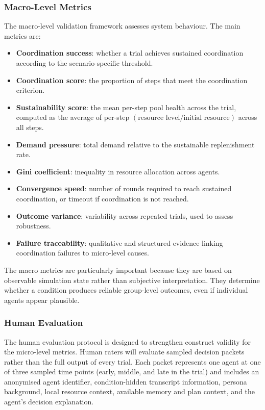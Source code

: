\documentclass[11pt]{article}
\begin{document}
\subsubsection{Macro-Level Metrics}
The macro-level validation framework assesses system behaviour. The main metrics are:

\begin{itemize}
    \item \textbf{Coordination success}: whether a trial achieves sustained coordination according to the scenario-specific threshold.
    \item \textbf{Coordination score}: the proportion of steps that meet the coordination criterion.
    \item \textbf{Sustainability score}: the mean per-step pool health across the trial, computed as the average of per-step $(\text{resource level} / \text{initial resource})$ across all steps.
    \item \textbf{Demand pressure}: total demand relative to the sustainable replenishment rate.
    \item \textbf{Gini coefficient}: inequality in resource allocation across agents.
    \item \textbf{Convergence speed}: number of rounds required to reach sustained coordination, or timeout if coordination is not reached.
    \item \textbf{Outcome variance}: variability across repeated trials, used to assess robustness.
    \item \textbf{Failure traceability}: qualitative and structured evidence linking coordination failures to micro-level causes.
\end{itemize}

The macro metrics are particularly important because they are based on observable simulation state rather than subjective interpretation. They determine whether a condition produces reliable group-level outcomes, even if individual agents appear plausible.

\subsubsection{Human Evaluation}
The human evaluation protocol is designed to strengthen construct validity for the micro-level metrics. Human raters will evaluate sampled decision packets rather than the full output of every trial. Each packet represents one agent at one of three sampled time points (early, middle, and late in the trial) and includes an anonymised agent identifier, condition-hidden transcript information, persona background, local resource context, available memory and plan context, and the agent's decision explanation.
\end{document}
